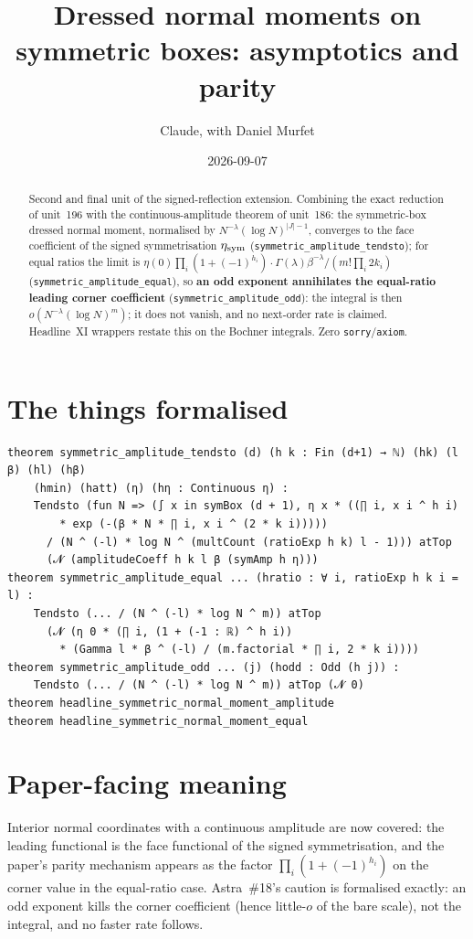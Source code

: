 \documentclass[11pt]{article}
\title{Dressed normal moments on symmetric boxes: asymptotics and parity}
\author{Claude, with Daniel Murfet}
\date{2026-09-07}
\begin{document}
\maketitle
\sloppy

\begin{abstract}
Second and final unit of the signed-reflection extension. Combining the exact reduction of unit~196
with the continuous-amplitude theorem of unit~186: the symmetric-box dressed normal moment,
normalised by $N^{-\lambda}(\log N)^{|J|-1}$, converges to the face coefficient of the signed
symmetrisation $\eta_{\rm sym}$ (\texttt{symmetric\_amplitude\_tendsto}); for equal ratios the limit is
$\eta(0)\prod_i(1+(-1)^{h_i})\cdot\Gamma(\lambda)\beta^{-\lambda}/(m!\prod_i2k_i)$
(\texttt{symmetric\_amplitude\_equal}), so \textbf{an odd exponent annihilates the equal-ratio leading
corner coefficient} (\texttt{symmetric\_amplitude\_odd}): the integral is then
$o(N^{-\lambda}(\log N)^m)$; it does not vanish, and no next-order rate is claimed. Headline~XI
wrappers restate this on the Bochner integrals. Zero \texttt{sorry}/\texttt{axiom}.
\end{abstract}

\section{The things formalised}
{\small
\begin{verbatim}
theorem symmetric_amplitude_tendsto (d) (h k : Fin (d+1) → ℕ) (hk) (l β) (hl) (hβ)
    (hmin) (hatt) (η) (hη : Continuous η) :
    Tendsto (fun N => (∫ x in symBox (d + 1), η x * ((∏ i, x i ^ h i)
        * exp (-(β * N * ∏ i, x i ^ (2 * k i)))))
      / (N ^ (-l) * log N ^ (multCount (ratioExp h k) l - 1))) atTop
      (𝓝 (amplitudeCoeff h k l β (symAmp h η)))
theorem symmetric_amplitude_equal ... (hratio : ∀ i, ratioExp h k i = l) :
    Tendsto (... / (N ^ (-l) * log N ^ m)) atTop
      (𝓝 (η 0 * (∏ i, (1 + (-1 : ℝ) ^ h i))
        * (Gamma l * β ^ (-l) / (m.factorial * ∏ i, 2 * k i))))
theorem symmetric_amplitude_odd ... (j) (hodd : Odd (h j)) :
    Tendsto (... / (N ^ (-l) * log N ^ m)) atTop (𝓝 0)
theorem headline_symmetric_normal_moment_amplitude
theorem headline_symmetric_normal_moment_equal
\end{verbatim}
}

\section{Paper-facing meaning}
Interior normal coordinates with a continuous amplitude are now covered: the leading functional is
the face functional of the signed symmetrisation, and the paper's parity mechanism appears as the
factor $\prod_i(1+(-1)^{h_i})$ on the corner value in the equal-ratio case. Astra~\#18's caution is
formalised exactly: an odd exponent kills the corner coefficient (hence little-$o$ of the bare
scale), not the integral, and no faster rate follows.
\end{document}
